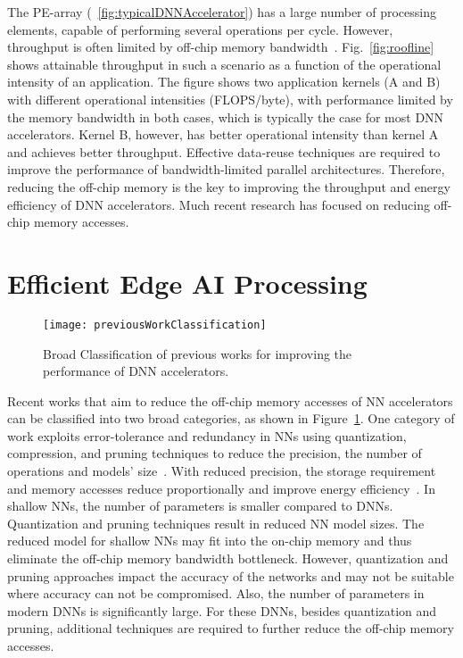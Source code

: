 The PE-array (\figurename{~\ref{fig:typicalDNNAccelerator}}) has a large number of processing elements, capable of performing several operations per cycle. However, throughput is often limited by off-chip memory bandwidth~\cite{williams2009roofline}. Fig.~\ref{fig:roofline} shows attainable throughput in such a scenario as a function of the operational intensity of an application. The figure shows two application kernels (A and B) with different operational intensities (FLOPS/byte), with performance limited by the memory bandwidth in both cases, which is typically the case for most DNN accelerators. Kernel B, however, has better operational intensity than kernel A and achieves better throughput. Effective data-reuse techniques are required to improve the performance of bandwidth-limited parallel architectures. Therefore, reducing the off-chip memory is the key to improving the throughput and energy efficiency of DNN accelerators. Much recent research has focused on reducing off-chip memory accesses.
\section{Efficient Edge AI Processing}
\begin{figure}[!htb]
	\centering
	\captionsetup{font=sf}
	\texttt{[image: previousWorkClassification]}
	\caption{Broad Classification of previous works for improving the performance of DNN accelerators.}
	\label{fig:previousWorkClassification}
\end{figure}
Recent works that aim to reduce the off-chip memory accesses of NN accelerators can be classified into two broad categories, as shown in Figure~\ref{fig:previousWorkClassification}. One category of work exploits error-tolerance and redundancy in NNs using quantization, compression, and pruning techniques to reduce the precision, the number of operations and models' size~\cite{ferreira2016fpga,wang2018c,chang2015recurrent,han2017ese,lee2016fpga}. With reduced precision, the storage requirement and memory accesses reduce proportionally and improve energy efficiency~\cite{sze2017efficient}. In shallow NNs, the number of parameters is smaller compared to DNNs. Quantization and pruning techniques result in reduced NN model sizes. The reduced model for shallow NNs may fit into the on-chip memory and thus eliminate the off-chip memory bandwidth bottleneck. However, quantization and pruning approaches impact the accuracy of the networks and may not be suitable where accuracy can not be compromised. Also, the number of parameters in modern DNNs is significantly large. For these DNNs, besides quantization and pruning, additional techniques are required to further reduce the off-chip memory accesses.

